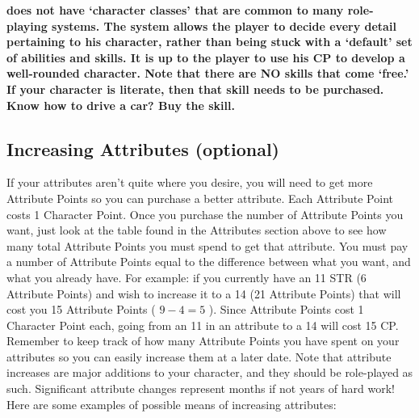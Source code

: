 \documentclass[twoside]{book}
\begin{document}
 \textbf{\APATHY{}  does not have `character
              classes' that are common to many role-playing
              systems. The \APATHY{}  system allows the player to decide
              every detail pertaining to his character, rather than being
              stuck with a `default' set of abilities and
              skills. It is up to the player to use his CP to develop a
              well-rounded character. Note that there are NO skills that
              come `free.' If your character is literate,
              then that skill needs to be purchased. Know how to drive a
              car? Buy the skill.
            }


    

\subsection{Increasing Attributes (optional)}
     If your attributes aren't quite where you
               desire, you will need to get more Attribute Points so you
               can purchase a better attribute. Each Attribute Point
               costs 1 Character Point. Once you purchase the number of
               Attribute Points you want, just look at the table found in
               the Attributes section above to see how many total
               Attribute Points you must spend to get that attribute.
                You must pay a number of Attribute Points equal to
              the difference between what you want, and what you already
              have. For example: if you currently have an 11 STR (6
              Attribute Points) and wish to increase it to a 14 (21
              Attribute Points) that will cost you 15 Attribute Points (
              \begin{math} 9  -  4  =
               5 \end{math} ). Since Attribute Points cost
              1 Character Point each, going from an 11 in an attribute to
              a 14 will cost 15 CP.
             Remember to keep track of how many Attribute Points
               you have spent on your attributes so you can easily
               increase them at a later date.  Note that attribute increases are major additions to
               your character, and they should be role-played as such.
               Significant attribute changes represent months if not
               years of hard work! Here are some examples of possible
               means of increasing attributes: 
\end{document}
